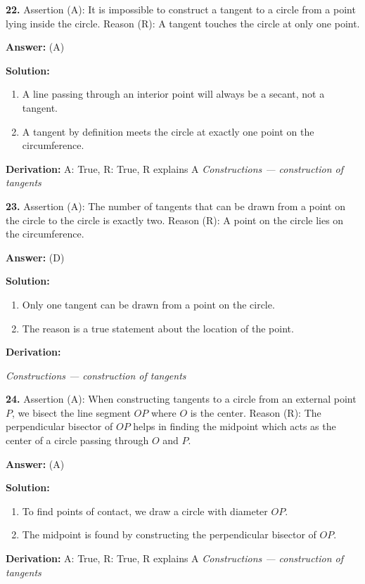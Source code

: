 \documentclass[12pt,a4paper]{exam}
\newcommand{\fitmath}[1]{%
  \sbox{\schmathbox}{$\displaystyle #1$}%
  \ifdim\wd\schmathbox>\linewidth
    \resizebox{\linewidth}{!}{\usebox{\schmathbox}}%
  \else
    \usebox{\schmathbox}%
  \fi}
\begin{document}
\begin{questions}
\question \textbf{22.} Assertion (A): It is impossible to construct a tangent to a circle from a point lying inside the circle. Reason (R): A tangent touches the circle at only one point.

\textbf{Answer:}
(A)

\textbf{Solution:}
\begin{enumerate}
  \item A line passing through an interior point will always be a secant, not a tangent.
  \item A tangent by definition meets the circle at exactly one point on the circumference.
\end{enumerate}
\textbf{Derivation:}
A: True, R: True, R explains A
\hfill \textit{Constructions — construction of tangents}
\vspace{0.3cm}

\question \textbf{23.} Assertion (A): The number of tangents that can be drawn from a point on the circle to the circle is exactly two. Reason (R): A point on the circle lies on the circumference.

\textbf{Answer:}
(D)

\textbf{Solution:}
\begin{enumerate}
  \item Only one tangent can be drawn from a point on the circle.
  \item The reason is a true statement about the location of the point.
\end{enumerate}
\textbf{Derivation:}
\begin{center}
\fitmath{A: \text{False}, R: \text{True}}
\end{center}
\hfill \textit{Constructions — construction of tangents}
\vspace{0.3cm}

\question \textbf{24.} Assertion (A): When constructing tangents to a circle from an external point $P$, we bisect the line segment $OP$ where $O$ is the center. Reason (R): The perpendicular bisector of $OP$ helps in finding the midpoint which acts as the center of a circle passing through $O$ and $P$.

\textbf{Answer:}
(A)

\textbf{Solution:}
\begin{enumerate}
  \item To find points of contact, we draw a circle with diameter $OP$.
  \item The midpoint is found by constructing the perpendicular bisector of $OP$.
\end{enumerate}
\textbf{Derivation:}
A: True, R: True, R explains A
\hfill \textit{Constructions — construction of tangents}
\vspace{0.3cm}


\end{questions}
\end{document}
